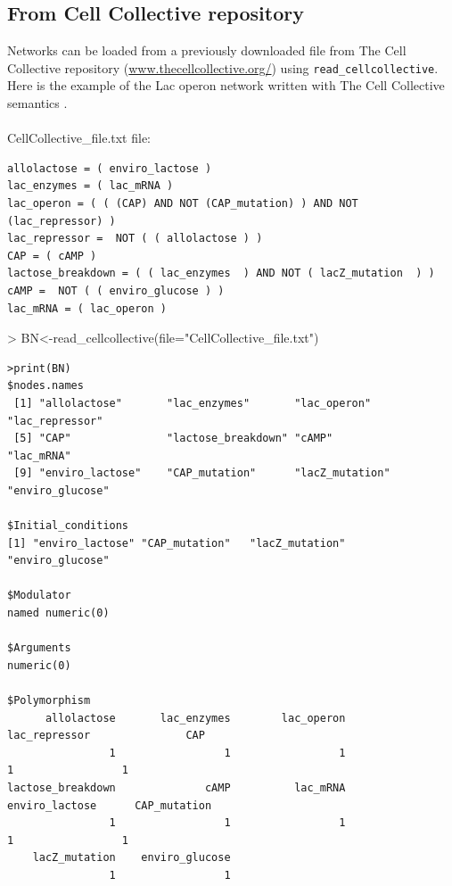 \documentclass[a4paper]{article}
\begin{document}
\subsection{From Cell Collective repository}
Networks can be loaded from a previously downloaded file from The Cell Collective repository (\url{www.thecellcollective.org/}) using \texttt{read\_cellcollective}.\\
Here is the example of the Lac operon network written with The Cell Collective semantics \cite{Helikar2015-um}.\\
\\ CellCollective\_file.txt file:
\begin{framed}
\begin{BVerbatim}
allolactose = ( enviro_lactose )
lac_enzymes = ( lac_mRNA )
lac_operon = ( ( (CAP) AND NOT (CAP_mutation) ) AND NOT (lac_repressor) )
lac_repressor =  NOT ( ( allolactose ) )
CAP = ( cAMP )
lactose_breakdown = ( ( lac_enzymes  ) AND NOT ( lacZ_mutation  ) )  
cAMP =  NOT ( ( enviro_glucose ) )
lac_mRNA = ( lac_operon ) 
\end{BVerbatim}
\end{framed}
\begin{Schunk}
\begin{Sinput}
> BN<-read_cellcollective(file="CellCollective_file.txt")
\end{Sinput}
\end{Schunk}

\begin{verbatim}
>print(BN)
$nodes.names
 [1] "allolactose"       "lac_enzymes"       "lac_operon"        "lac_repressor"    
 [5] "CAP"               "lactose_breakdown" "cAMP"              "lac_mRNA"         
 [9] "enviro_lactose"    "CAP_mutation"      "lacZ_mutation"     "enviro_glucose"   

$Initial_conditions
[1] "enviro_lactose" "CAP_mutation"   "lacZ_mutation"  "enviro_glucose"

$Modulator
named numeric(0)

$Arguments
numeric(0)

$Polymorphism
      allolactose       lac_enzymes        lac_operon     lac_repressor               CAP 
                1                 1                 1                 1                 1 
lactose_breakdown              cAMP          lac_mRNA    enviro_lactose      CAP_mutation 
                1                 1                 1                 1                 1 
    lacZ_mutation    enviro_glucose 
                1                 1 

\end{verbatim}
\end{document}

